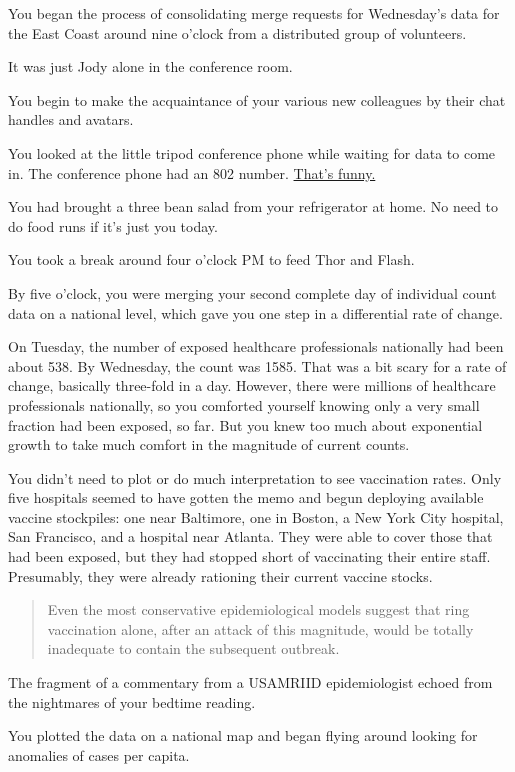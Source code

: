 \documentclass[17pt, twoside, a5paper, openright, extrafontsizes]{memoir}
\renewcommand{\emph}[1]{\ul{#1}}
\begin{document}
You began the process of consolidating merge requests for Wednesday's
data for the East Coast around nine o'clock from a distributed group of
volunteers.

It was just Jody alone in the conference room.

You begin to make the acquaintance of your various new colleagues by
their chat handles and avatars.

You looked at the little tripod conference phone while waiting for data
to come in. The conference phone had an 802 number. \emph{That's funny.}

You had brought a three bean salad from your refrigerator at home. No
need to do food runs if it's just you today.

You took a break around four o'clock PM to feed Thor and Flash.

By five o'clock, you were merging your second complete day of individual
count data on a national level, which gave you one step in a
differential rate of change.

On Tuesday, the number of exposed healthcare professionals nationally
had been about 538. By Wednesday, the count was 1585. That was a bit
scary for a rate of change, basically three-fold in a day. However,
there were millions of healthcare professionals nationally, so you
comforted yourself knowing only a very small fraction had been exposed,
so far. But you knew too much about exponential growth to take much
comfort in the magnitude of current counts.

You didn't need to plot or do much interpretation to see vaccination
rates. Only five hospitals seemed to have gotten the memo and begun
deploying available vaccine stockpiles: one near Baltimore, one in
Boston, a New York City hospital, San Francisco, and a hospital near
Atlanta. They were able to cover those that had been exposed, but they
had stopped short of vaccinating their entire staff. Presumably, they
were already rationing their current vaccine stocks.

\begin{quote}
Even the most conservative epidemiological models suggest that ring
vaccination alone, after an attack of this magnitude, would be totally
inadequate to contain the subsequent outbreak.
\end{quote}

The fragment of a commentary from a USAMRIID epidemiologist echoed from
the nightmares of your bedtime reading.

You plotted the data on a national map and began flying around looking
for anomalies of cases per capita.
\end{document}
